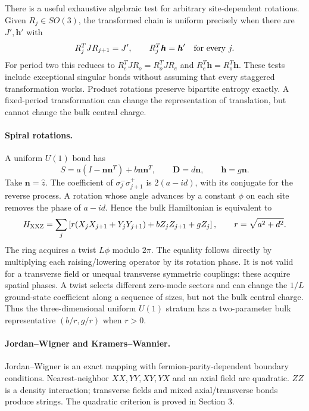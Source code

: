 \documentclass[11pt]{article}
\newcommand{\nn}{\boldsymbol n}
\newcommand{\DD}{\boldsymbol D}
\newcommand{\hh}{\boldsymbol h}
\begin{document}
There is a useful exhaustive algebraic test for arbitrary site-dependent
rotations. Given $R_j\in SO(3)$, the transformed chain is uniform precisely when
there are $J',\hh'$ with
\begin{equation}
 R_j^TJR_{j+1}=J',\qquad R_j^T\hh=\hh'\quad\hbox{for every }j.
 \label{eq:gauge}
\end{equation}
For period two this reduces to
$R_e^TJR_o=R_o^TJR_e$ and $R_e^T\hh=R_o^T\hh$.
These tests include exceptional singular bonds without assuming that every
staggered transformation works. Product rotations preserve bipartite entropy
exactly. A fixed-period transformation can change the representation of
translation, but cannot change the bulk central charge.

\paragraph{Spiral rotations.}
A uniform $U(1)$ bond has
\begin{equation}
 S=a(I-\nn\nn^T)+b\nn\nn^T,\qquad
 \DD=d\nn,\qquad\hh=g\nn. \label{eq:U1}
\end{equation}
Take $\nn=\hat z$. The coefficient of
$\sigma_j^-\sigma_{j+1}^+$ is $2(a-id)$, with its conjugate for the reverse
process. A rotation whose angle advances by a constant $\phi$ on each site
removes the phase of $a-id$. Hence the bulk Hamiltonian is equivalent to
\begin{equation}
 H_{\rm XXZ}=\sum_j\left[r(X_jX_{j+1}+Y_jY_{j+1})+
 bZ_jZ_{j+1}+gZ_j\right],\qquad r=\sqrt{a^2+d^2}.
 \label{eq:xxz}
\end{equation}
The ring acquires a twist $L\phi$ modulo $2\pi$. The equality follows directly
by multiplying each raising/lowering operator by its rotation phase. It is
not valid for a transverse field or unequal transverse symmetric couplings:
these acquire spatial phases. A twist selects different zero-mode sectors and
can change the $1/L$ ground-state coefficient along a sequence of sizes, but
not the bulk central charge. Thus the three-dimensional uniform $U(1)$ stratum
has a two-parameter bulk representative $(b/r,g/r)$ when $r>0$.

\paragraph{Jordan--Wigner and Kramers--Wannier.}
Jordan--Wigner is an exact mapping with fermion-parity-dependent boundary
conditions. Nearest-neighbor $XX,YY,XY,YX$ and an axial field are quadratic.
$ZZ$ is a density interaction; transverse fields and mixed axial/transverse
bonds produce strings. The quadratic criterion is proved in Section 3.
\end{document}
